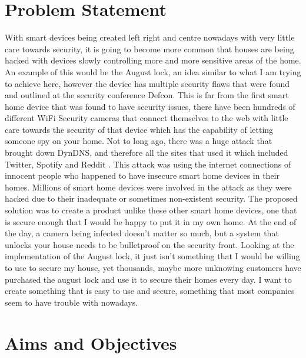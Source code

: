 \section{Problem Statement}
With smart devices being created left right and centre nowadays with very little care towards security, it is going to become more common that houses are being hacked with devices slowly controlling more and more sensitive areas of the home. An example of this would be the August lock, an idea similar to what I am trying to achieve here, however the device has multiple security flaws that were found and outlined at the security conference Defcon. This is far from the first smart home device that was found to have security issues, there have been hundreds of different WiFi Security cameras that connect themselves to the web with little care towards the security of that device which has the capability of letting someone spy on your home. Not to long ago, there was a huge attack that brought down DynDNS, and therefore all the sites that used it which included Twitter, Spotify and Reddit . This attack was using the internet connections of innocent people who happened to have insecure smart home devices in their homes. Millions of smart home devices were involved in the attack as they were hacked due to their inadequate or sometimes non-existent security.
\newline
\newline
The proposed solution was to create a product unlike these other smart home devices, one that is secure enough that I would be happy to put it in my own home. At the end of the day, a camera being infected doesn't matter so much, but a system that unlocks your house needs to be bulletproof on the security front. Looking at the implementation of the August lock, it just isn't something that I would be willing to use to secure my house, yet thousands, maybe more unknowing customers have purchased the august lock and use it to secure their homes every day. I want to create something that is easy to use and secure, something that most companies seem to have trouble with nowadays.

\section{Aims and Objectives}

